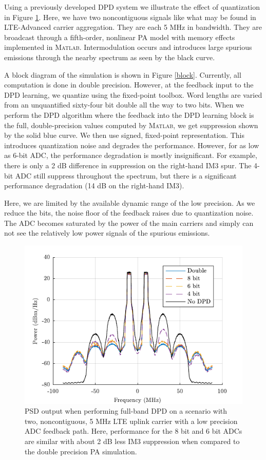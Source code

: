 \documentclass[conference]{IEEEtran}
\begin{document}
Using a previously developed DPD system \cite{Li2016GPU} we illustrate the effect of quantization in Figure \ref{fullbandpsd}. 
Here, we have two noncontiguous signals like what may be found in LTE-Advanced carrier aggregation. They are each 5 MHz in bandwidth. 
They are broadcast through a fifth-order, nonlinear PA model with memory effects implemented in \textsc{Matlab}. 
Intermodulation occurs and introduces large spurious emissions through the nearby spectrum as seen by the black curve.


A block diagram of the simulation is shown in Figure \ref{block}. Currently, all computation is done in double precision. However, at the feedback input to the DPD learning, we quantize using the fixed-point toolbox. Word lengths are varied from an unquantified sixty-four bit double all the way to two bits. When we perform the DPD algorithm where the feedback into the DPD learning block is the full, double-precision values computed by \textsc{Matlab}, we get suppression shown by the solid blue curve. We then use signed, fixed-point representation. This introduces quantization noise and degrades the performance. However, for as low as 6-bit ADC, the performance degradation is mostly insignificant. For example, there is only a 2 dB difference in suppression on the right-hand IM3 spur. The 4-bit ADC still suppress throughout the spectrum, but there is a significant performance degradation (14 dB on the right-hand IM3). 

Here, we are limited by the available dynamic range of the low precision. 
As we reduce the bits, the noise floor of the feedback raises due to quantization noise. 
The ADC becomes saturated by the power of the main carriers and simply can not see the relatively low power signals of the spurious emissions. 


\begin{figure}[]
\centering
\includegraphics[]{FullBandPSD}
\caption{PSD output when performing full-band DPD on a scenario with two, noncontiguous, 5 MHz LTE uplink carrier with a low precision ADC feedback path. Here, performance for the 8 bit and 6 bit ADCs are similar with about 2 dB less IM3 suppression when compared to the double precision PA simulation.}
\label{fullbandpsd}
\end{figure}
\end{document}
